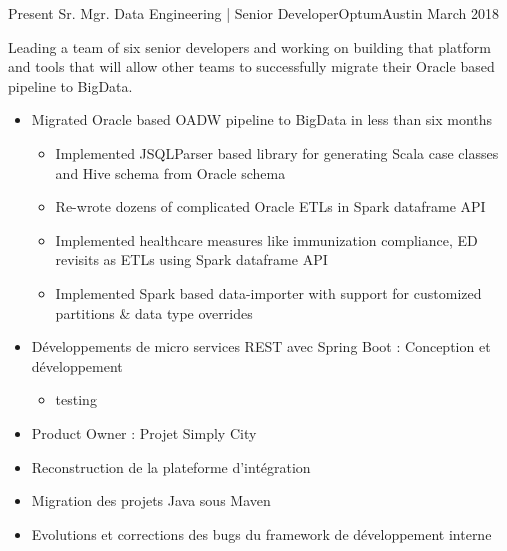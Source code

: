 %
%
%

\begin{experiences}
  \experience
    {Present}   {Sr. Mgr. Data Engineering | Senior Developer}{Optum}{Austin}
    {March 2018} {
    				  Leading a team of six senior developers and working on building that platform and tools that will allow other teams to successfully migrate their Oracle based pipeline to BigData.
                      \begin{itemize}
                        \item Migrated Oracle based OADW pipeline to BigData in less than six months
                        \begin{itemize}
                        	\item Implemented JSQLParser based library for generating Scala case classes and Hive schema from Oracle schema
                        	\item Re-wrote dozens of complicated Oracle ETLs in Spark dataframe API
                        	\item Implemented healthcare measures like immunization compliance, ED revisits as ETLs using Spark dataframe API
                        	\item Implemented Spark based data-importer with support for customized partitions \& data type overrides
                        \end{itemize}
                        \item Développements de micro services REST avec Spring Boot : Conception et développement
                        \begin{itemize}
                        	\item testing 
                        \end{itemize}
                        \item Product Owner : Projet Simply City
                        \item Reconstruction de la plateforme d'intégration
                        \item Migration des projets Java sous Maven
                        \item Evolutions et corrections des bugs du framework de développement interne  

\end{itemize}}
\end{experiences}

